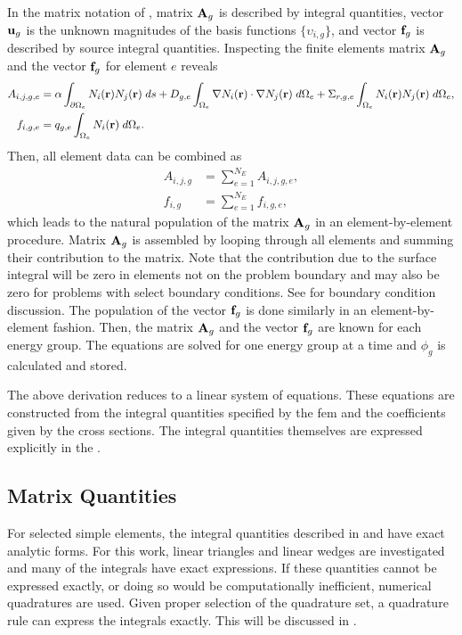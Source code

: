     In the matrix notation of , matrix $\mathbf{A}_g$ is 
    described by integral quantities, vector $\mathbf{u}_g$ is the unknown magnitudes 
    of the basis functions $\{\upsilon_{i,g}\}$, and vector $\mathbf{f}_g$ is described
    by source integral quantities. Inspecting the finite elements matrix $\mathbf{A}_g$ 
    and the vector $\mathbf{f}_g$ for element $e$ reveals 
    \begin{align}
      \label{eq:matrix_population}
      A_{i,j,g,e} &= \alpha \int_{\partial \Omega_e} N_i(\mathbf{r}) 
        N_j(\mathbf{r}) \; ds + D_{g,e} 
        \int_{\Omega_e} \mathbf{\nabla} N_i(\mathbf{r}) \cdot \mathbf{\nabla} N_j(\mathbf{r}) \;
        d\Omega_e + \Sigma_{r,g,e} \int_{\Omega_e} N_i(\mathbf{r}) N_j(\mathbf{r})
        \; d\Omega_e, \\
      \label{eq:vector_population}
      f_{i,g,e} &= q_{g,e} \int_{\Omega_e} N_i(\mathbf{r}) \;d\Omega_e.
    \end{align}
    Then, all element data can be combined as
    \begin{align}
      A_{i,j,g} &= \sum_{e=1}^{N_E} A_{i,j,g,e}, \\
      f_{i,g} &=  \sum_{e=1}^{N_E} f_{i,g,e},
    \end{align}
    which leads to the natural population of the matrix $\mathbf{A}_g$ in an
    element-by-element procedure. Matrix $\mathbf{A}_g$ is assembled by looping through
    all elements and summing their contribution to the matrix. Note that the
    contribution due to the surface integral will be zero in elements not on the
    problem boundary and may also be zero for problems with select boundary
    conditions. See  for boundary condition
    discussion. The population of the vector $\mathbf{f}_g$ is done similarly in an
    element-by-element fashion. Then, the matrix $\mathbf{A}_g$ and the vector $\mathbf{f}_g$
    are known for each energy group. The equations are solved for one energy
    group at a time and $\phi_g$ is calculated and stored. 
    
    The above derivation reduces to a linear system of equations. These
    equations are constructed from the integral quantities specified by the
    \gls{fem} and the coefficients given by the cross sections.  The integral
    quantities themselves are expressed explicitly in the
    .
    
  \subsection{Matrix Quantities}
    \label{sec:matrix_quantities}
    For selected simple elements, the integral quantities described in 
     and  have exact 
    analytic forms. For this work, linear triangles and linear wedges
    are investigated and many of the integrals have exact expressions. If these 
    quantities cannot be expressed exactly, or doing so would be computationally
    inefficient, numerical quadratures are used. Given proper selection of
    the quadrature set, a quadrature rule can express the integrals exactly. 
    This will be discussed in .

